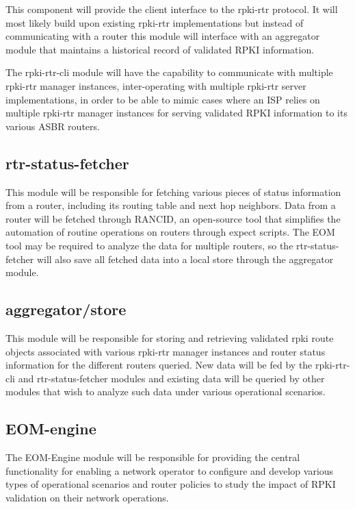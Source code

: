 This component will provide the client interface to the rpki-rtr
protocol.  It will most likely build upon existing rpki-rtr
implementations but instead of communicating with a router this
module will interface with an aggregator module that maintains a
historical record of validated RPKI information.

The rpki-rtr-cli module will have the capability to communicate with
multiple rpki-rtr manager instances, inter-operating with multiple 
rpki-rtr server implementations, in order to be able to mimic cases 
where an ISP relies on multiple rpki-rtr manager instances for serving
validated RPKI information to its various ASBR routers.

\subsection{rtr-status-fetcher}

This module will be responsible for fetching various pieces of status
information from a router, including its routing table and next hop
neighbors. Data from a router will be fetched through RANCID, an open-source
tool that simplifies the automation of routine operations on routers
through expect scripts. The EOM tool may be required to analyze the data
for multiple routers, so the rtr-status-fetcher will also save all fetched
data into a local store through the aggregator module. 

\subsection{aggregator/store}

This module will be responsible for storing and retrieving validated
rpki route objects associated with various rpki-rtr manager instances
and router status information for the different routers queried.
New data will be fed by the rpki-rtr-cli and rtr-status-fetcher
modules and existing data will be queried by other modules that wish to
analyze such data under various operational scenarios. 

\subsection{EOM-engine}

The EOM-Engine module will be responsible for providing the
central functionality for enabling a network operator to configure and
develop various types of operational scenarios and router policies to
study the impact of RPKI validation on their network operations. 

